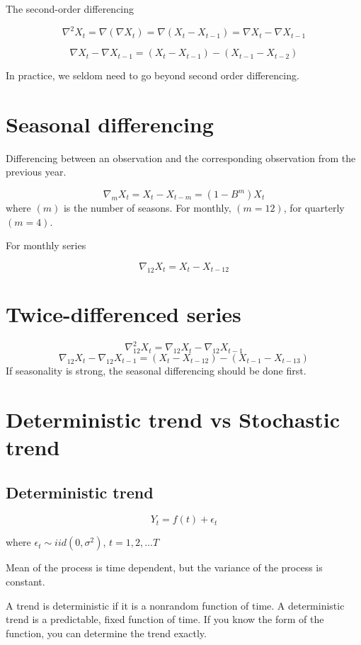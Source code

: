 \documentclass[
  11pt,
  a4paper,
]{report}
\begin{document}
The second-order differencing

\[\nabla^2X_t=\nabla(\nabla X_t)=\nabla(X_t-X_{t-1})=\nabla X_t - \nabla X_{t-1}\]

\[\nabla X_t - \nabla X_{t-1}=(X_t-X_{t-1})-(X_{t-1}-X_{t-2})\]

In practice, we seldom need to go beyond second order differencing.

\section{Seasonal differencing}\label{seasonal-differencing}

Differencing between an observation and the corresponding observation
from the previous year.

\[\nabla_mX_t=X_t-X_{t-m}=(1-B^m)X_t\] where \((m)\) is the number of
seasons. For monthly, \((m=12)\), for quarterly \((m=4)\).

For monthly series

\[\nabla_{12}X_t=X_t-X_{t-12}\]

\section{Twice-differenced series}\label{twice-differenced-series}

\[\nabla^2_{12}X_t=\nabla_{12}X_t-\nabla_{12}X_{t-1}\]
\[\nabla_{12}X_t-\nabla_{12}X_{t-1}=(X_t-X_{t-12})-(X_{t-1}-X_{t-13})\]
If seasonality is strong, the seasonal differencing should be done
first.

\section{Deterministic trend vs Stochastic
trend}\label{deterministic-trend-vs-stochastic-trend}

\subsection{Deterministic trend}\label{deterministic-trend}

\[Y_t  = f(t) + \epsilon_t\]

where \(\epsilon_t \sim iid(0, \sigma^2)\), \(t = 1, 2, ...T\)

Mean of the process is time dependent, but the variance of the process
is constant.

A trend is deterministic if it is a nonrandom function of time. A
deterministic trend is a predictable, fixed function of time. If you
know the form of the function, you can determine the trend exactly.
\end{document}

